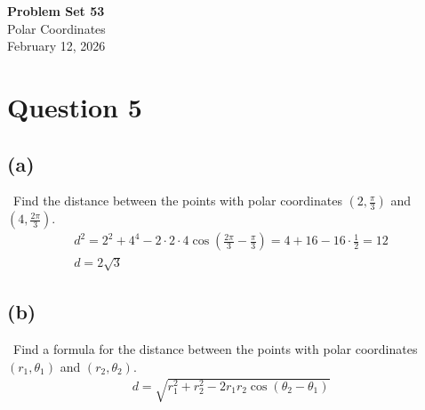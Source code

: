 \documentclass[12pt]{article}
\begin{document}
\vspace*{0cm}

\begin{center}
    {\Large \bfseries Problem Set 53} \\[0.5cm]
    {\large Polar Coordinates} \\[0.35cm]
    {\normalsize February 12, 2026}
\end{center}


\section{Question 5}
\subsection{(a)} \, Find the distance between the points with polar coordinates $(2,\frac{\pi}{3})$ and $(4,\frac{2\pi}{3})$.
\begin{gather*}
d^2 = 2^2+4^4-2\cdot2\cdot4\cos(\frac{2\pi}{3}-\frac{\pi}{3})=4+16-16\cdot\frac{1}{2}=12\\
\boxed{d=2\sqrt{3}}
\end{gather*}

\subsection{(b)} \, Find a formula for the distance between the points with polar coordinates $(r_1, \theta_1)$ and $(r_2, \theta_2)$.
\begin{gather*}
\boxed{d=\sqrt{r_1^2+r_2^2-2r_1r_2\cos(\theta_2-\theta_1)}}
\end{gather*}
\end{document}
